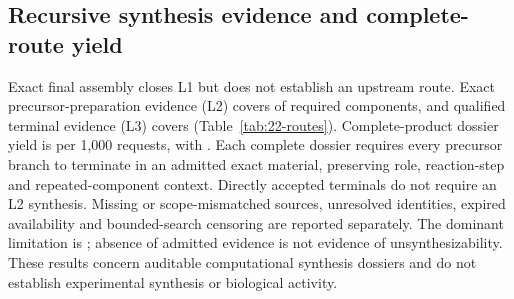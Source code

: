 \subsection{Recursive synthesis evidence and complete-route yield}
Exact final assembly closes L1 but does not establish an upstream route. Exact precursor-preparation
evidence (L2) covers  of required components, and qualified
terminal evidence (L3) covers 
(Table~\ref{tab:22-routes}). Complete-product dossier yield is
 per 1,000 requests, with
. Each complete dossier requires every precursor branch
to terminate in an admitted exact material, preserving role, reaction-step and repeated-component
context. Directly accepted terminals do not require an L2 synthesis. Missing or scope-mismatched
sources, unresolved identities, expired availability and bounded-search censoring are reported
separately. The dominant limitation is ; absence of admitted
evidence is not evidence of unsynthesizability. These results concern auditable computational
synthesis dossiers and do not establish experimental synthesis or biological activity.
